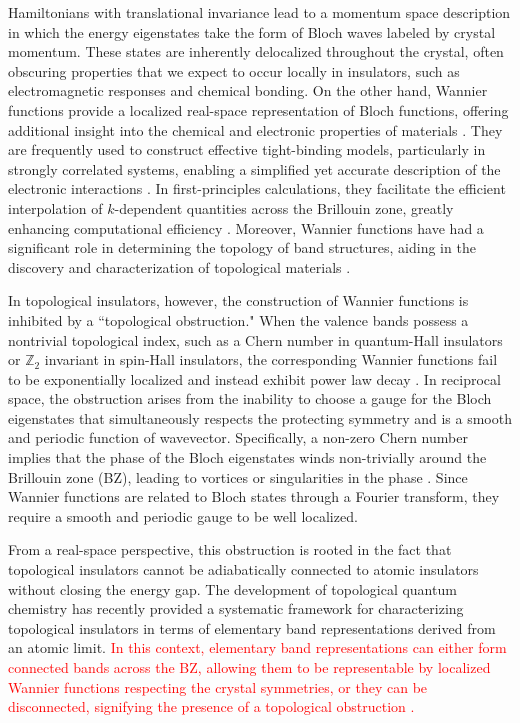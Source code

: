 \documentclass[galley,aps,pra,10pt,amsmath,amssymb,
    superscriptaddress,nofootinbib,longbibliography]{revtex4-2}
\def\Red#1{\textcolor{red}{#1}}
\newcounter{comm}
\def\commnext{\stepcounter{comm}}
\def\commtext{{\bf\color{blue}[\arabic{comm}]}}
\def\commmar{{\bf\color{blue}[\arabic{comm}]}}
\def\tcm#1{\commnext\marginpar{\small TC\commmar: #1}\commtext}
\begin{document}
Hamiltonians with translational invariance lead to a momentum space description in which the energy eigenstates take the form of Bloch waves labeled by crystal momentum. These states are inherently delocalized throughout the crystal, often obscuring properties that we expect to occur locally in insulators, such as electromagnetic responses and chemical bonding. On the other hand, Wannier functions provide a localized real-space representation of Bloch functions, offering additional insight into the chemical and electronic properties of materials \cite{wannier1937, kohn1959, foster1960, boys1960,cloizeaux1964}. They are frequently used to construct effective tight-binding models, particularly in strongly correlated systems, enabling a simplified yet accurate description of the electronic interactions \cite{solovyev2006, jung2013, gresch2018, lihm2019, Li_2021}. In first-principles calculations, they facilitate the efficient interpolation of $k$-dependent quantities across the Brillouin zone, greatly enhancing computational efficiency \cite{yates2007, calzolari2004}. Moreover, Wannier functions have had a significant role in determining the topology of band structures, aiding in the discovery and characterization of topological materials \cite{soluyanov2011, Bradlyn2017, po2019, Po2018}.

In topological insulators, however, the construction of Wannier functions is inhibited by a ``topological obstruction." When the valence bands possess a nontrivial topological index, such as a Chern number in quantum-Hall insulators or $\mathbb{Z}_2$ invariant in spin-Hall insulators, the corresponding Wannier functions fail to be exponentially localized and instead exhibit power law decay \cite{Bradlyn2017, Po2018}. In reciprocal space, the obstruction arises from the inability to choose a gauge for the Bloch eigenstates that simultaneously respects the protecting symmetry and is a smooth and periodic function of wavevector. Specifically, a non-zero Chern number implies that the phase of the Bloch eigenstates winds non-trivially around the Brillouin zone (BZ), leading to vortices or singularities in the phase \cite{soluyanov2011, Vanderbilt2018}. Since Wannier functions are related to Bloch states through a Fourier transform, they require a smooth and periodic gauge to be well localized. 

From a real-space perspective, this obstruction is rooted in the fact that topological insulators cannot be adiabatically connected to atomic insulators without closing the energy gap. The development of topological quantum chemistry has recently provided a systematic framework for characterizing topological insulators in terms of elementary band representations derived from an atomic limit. \Red{ In this context, elementary band representations can either form connected bands across the BZ, allowing them to be representable by localized Wannier functions respecting the crystal symmetries, or they can be disconnected, signifying the presence of a topological obstruction \cite{Bradlyn2017, Cano2018, Cano2021}. } \tcm{Need to add citation and clarify}
\end{document}
